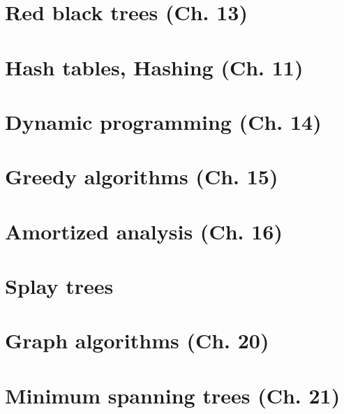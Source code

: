 \documentclass{article}
\begin{document}
\section{Red black trees (Ch. 13)}

\newpage


\section{Hash tables, Hashing (Ch. 11)}

\newpage


\section{Dynamic programming (Ch. 14)}

\newpage


\section{Greedy algorithms (Ch. 15)} %

\newpage


\section{Amortized analysis (Ch. 16)}

\newpage

\section{Splay trees}

\newpage


\section{Graph algorithms (Ch. 20)}

\newpage


\section{Minimum spanning trees (Ch. 21)}

\newpage
\end{document}
